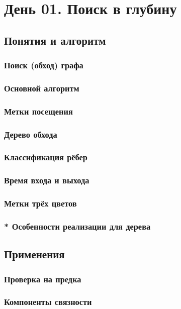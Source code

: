 \documentclass[a4paper,12pt]{article}
\begin{document}
  \section{День 01. Поиск в глубину}

    \subsection{Понятия и алгоритм}
      \subsubsection{Поиск (обход) графа}
      \subsubsection{Основной алгоритм}
      \subsubsection{Метки посещения}
      \subsubsection{Дерево обхода}
      \subsubsection{Классификация рёбер}
      \subsubsection{Время входа и выхода}
      \subsubsection{Метки трёх цветов}
      \subsubsection{* Особенности реализации для дерева}

    \subsection{Применения}
      \subsubsection{Проверка на предка}
      \subsubsection{Компоненты связности}
\end{document}
